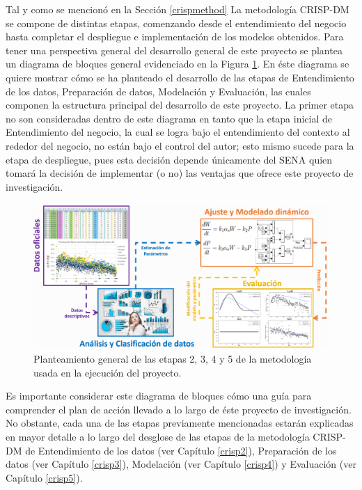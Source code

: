 Tal y como se mencionó en la Sección \ref{crispmethod} La metodología CRISP-DM se compone de distintas etapas, comenzando desde el entendimiento del negocio  hasta completar el despliegue e implementación de los modelos obtenidos. Para tener una perspectiva general del desarrollo general de este proyecto se plantea un diagrama de bloques general evidenciado en la Figura \ref{tesispptsenapng}. En éste diagrama se quiere mostrar cómo se ha planteado el desarrollo de las etapas de Entendimiento de los datos, Preparación de datos, Modelación y Evaluación, las cuales componen la estructura principal del desarrollo de este proyecto. La primer etapa no son consideradas dentro de este diagrama en tanto que la etapa inicial de Entendimiento del negocio, la cual se logra bajo el entendimiento del contexto al rededor del negocio, no están bajo el control del autor; esto mismo sucede para la etapa de despliegue, pues esta decisión depende únicamente del SENA quien tomará la decisión de implementar (o no) las ventajas que ofrece este proyecto de investigación. 

\begin{figure}[H]
    \centering
    \includegraphics[width=\textwidth]{img/tesispptsena.png}
    \caption{Planteamiento general de las etapas 2, 3, 4 y 5 de la metodología usada en la ejecución del proyecto.}
    \label{tesispptsenapng}
\end{figure}

Es importante considerar este diagrama de bloques cómo una guía para comprender el plan de acción llevado a lo largo de éste proyecto de investigación. No obstante, cada una de las etapas previamente mencionadas estarán explicadas en mayor detalle a lo largo del desglose de las etapas de la metodología CRISP-DM de Entendimiento de los datos (ver Capítulo \ref{crisp2}), Preparación de los datos (ver Capítulo \ref{crisp3}), Modelación (ver Capítulo \ref{crisp4}) y Evaluación (ver Capítulo \ref{crisp5}).



\pagebreak

